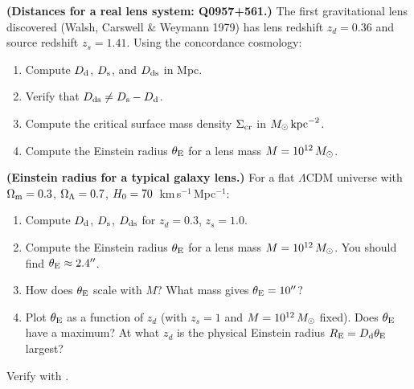 \begin{exercise}
\label{ex:real_lens}
\textbf{(Distances for a real lens system: Q0957+561.)}
The first gravitational lens discovered (Walsh, Carswell \& Weymann 1979)
has lens redshift $z_d = 0.36$ and source redshift $z_s = 1.41$.
Using the concordance cosmology:
\begin{enumerate}[label=(\alph*)]
    \item Compute $D_{\mathrm{d}}$, $D_{\mathrm{s}}$, and $D_{\mathrm{ds}}$ in Mpc.
    \item Verify that $D_{\mathrm{ds}} \neq D_{\mathrm{s}} - D_{\mathrm{d}}$.
    \item Compute the critical surface mass density $\Sigma_{\mathrm{cr}}$ in
          $M_{\odot}\,\text{kpc}^{-2}$.
    \item Compute the Einstein radius $\theta_{\mathrm{E}}$ for a lens mass
          $M = 10^{12}\,M_{\odot}$.
\end{enumerate}
\end{exercise}

\begin{exercise}
\label{ex:einstein_radius_numerical}
\textbf{(Einstein radius for a typical galaxy lens.)}
For a flat $\Lambda$CDM universe with $\Omega_{\mathrm{m}} = 0.3$,
$\Omega_{\Lambda} = 0.7$, $H_0 = 70$~km\,s$^{-1}$\,Mpc$^{-1}$:
\begin{enumerate}[label=(\alph*)]
    \item Compute $D_{\mathrm{d}}$, $D_{\mathrm{s}}$, $D_{\mathrm{ds}}$ for $z_d = 0.3$, $z_s = 1.0$.
    \item Compute the Einstein radius $\theta_{\mathrm{E}}$ for a lens mass
          $M = 10^{12}\,M_{\odot}$.  You should find $\theta_{\mathrm{E}} \approx 2.4''$.
    \item How does $\theta_{\mathrm{E}}$ scale with $M$?  What mass gives
          $\theta_{\mathrm{E}} = 10''$?
    \item Plot $\theta_{\mathrm{E}}$ as a function of $z_d$ (with $z_s = 1$ and
          $M = 10^{12}\,M_{\odot}$ fixed).  Does $\theta_{\mathrm{E}}$ have a maximum?
          At what $z_d$ is the physical Einstein radius
          $R_{\mathrm{E}} = D_{\mathrm{d}}\theta_{\mathrm{E}}$ largest?
\end{enumerate}
Verify with
.
\end{exercise}
